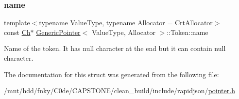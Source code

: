 \mbox{\label{structGenericPointer_1_1Token_a8aa9b13bd66addb0c0512cfcae72174c}} 
\subsubsection{\texorpdfstring{name}{name}}
{\footnotesize\ttfamily template$<$typename Value\+Type, typename Allocator = Crt\+Allocator$>$ \\
const \hyperlink{classGenericPointer_ab292356c11b4015c98d21b966b11f285}{Ch}$\ast$ \hyperlink{classGenericPointer}{Generic\+Pointer}$<$ Value\+Type, Allocator $>$\+::Token\+::name}



Name of the token. It has null character at the end but it can contain null character. 



The documentation for this struct was generated from the following file\+:\begin{DoxyCompactItemize}
\item 
/mnt/hdd/fnky/\+C0de/\+C\+A\+P\+S\+T\+O\+N\+E/clean\+\_\+build/include/rapidjson/\hyperlink{pointer_8h}{pointer.\+h}\end{DoxyCompactItemize}
